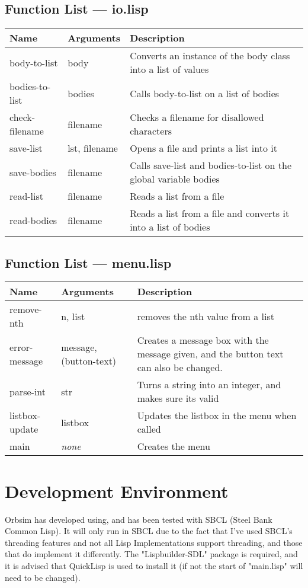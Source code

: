 \subsection{Function List --- io.lisp}
\begin{tabular}{p{}p{}p{}}
	Name & Arguments & Description\\ \hline
	body-to-list & body & Converts an instance of the body class into a list
	of values \\ 
	bodies-to-list & bodies & Calls body-to-list on a list of bodies \\
	check-filename & filename & Checks a filename for disallowed characters
	\\
	save-list & lst, filename & Opens a file and prints a list into it \\
	save-bodies & filename & Calls save-list and bodies-to-list on the
	global variable bodies \\
	read-list & filename & Reads a list from a file \\
	read-bodies & filename & Reads a list from a file and converts it into a
	list of bodies \\ 
\end{tabular}

\subsection{Function List --- menu.lisp}
\begin{tabular}{p{}p{}p{}}
	Name & Arguments & Description\\ \hline
	remove-nth & n, list & removes the nth value from a list \\
	error-message & message, (button-text) & Creates a message box with the
	message given, and the button text can also be changed. \\
	parse-int & str & Turns a string into an integer, and makes sure its
	valid \\
	listbox-update & listbox & Updates the listbox in the menu when called
	\\
	main & \emph{none}  & Creates the menu \\
\end{tabular}

\section{Development Environment}
Orbsim has developed using, and has been tested with SBCL (Steel Bank Common
Lisp). It will only run in SBCL due to the fact that I've used SBCL's threading
features and not all Lisp Implementations support threading, and those that do
implement it differently. The "Lispbuilder-SDL" package is required, and it is
advised that QuickLisp is used to install it (if not the start of "main.lisp"
will need to be changed). 

